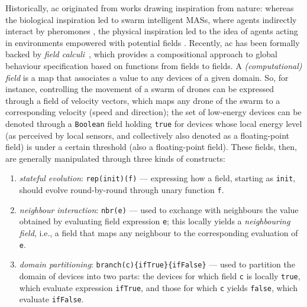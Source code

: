 \documentclass[11pt]{article}
\begin{document}
Historically, \ac{ac} originated from works drawing inspiration from nature: whereas the biological inspiration led to swarm intelligent MASs, where agents indirectly interact by pheromones \cite{DBLP:conf/atal/ParunakBS02}, the physical inspiration led to the idea of agents acting in environments empowered with potential fields \cite{DBLP:journals/trob/HwangA92}.
%
Recently, \ac{ac} has been formally backed by \emph{field calculi}~\cite{viroli2019jlamp-si-coord}, which provides a compositional approach to global behaviour specification based on functions from fields to fields.
%
A \emph{(computational) field} is a map that associates a value to any devices of a given domain.
%
So, for instance, controlling the movement of a swarm of drones can be expressed through a field of velocity vectors, which maps any drone of the swarm to a corresponding velocity (speed and direction); 
%
the set of low-energy devices can be denoted through a \lstinline|Boolean| field holding \texttt{true} for devices whose local energy level (as perceived by local sensors, and collectively also denoted as a floating-point field) is under a certain threshold (also a floating-point field).
%
These fields, then, are generally manipulated through three kinds of constructs:
\begin{enumerate}
\item \emph{stateful evolution}: \lstinline|rep(init)(f)| --- expressing how a field, starting as \lstinline|init|, should evolve round-by-round through unary function \lstinline|f|.
\item \emph{neighbour interaction}: \lstinline|nbr(e)| --- used to exchange with neighbours the value obtained by evaluating field expression \lstinline|e|; this locally yields a \emph{neighbouring field}, i.e., a field that maps any neighbour to the corresponding evaluation of \lstinline|e|.
\item \emph{domain partitioning}: \lstinline|branch(c){ifTrue}{ifFalse}| --- used to partition the domain of devices into two parts: the devices for which field \lstinline|c| is locally \lstinline|true|, which evaluate expression \lstinline|ifTrue|, and those for which \lstinline|c| yields \lstinline|false|, which evaluate \lstinline|ifFalse|. 
\end{enumerate}
\end{document}
